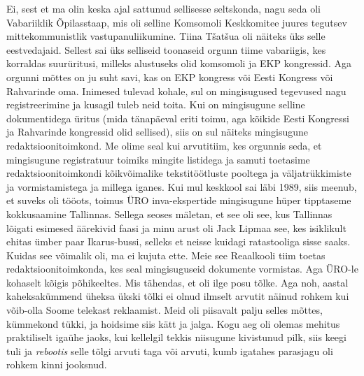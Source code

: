 Ei, sest et ma olin keska ajal sattunud sellisesse seltskonda, nagu seda oli Vabariiklik Õpilasstaap, mis oli selline Komsomoli Keskkomitee juures tegutsev mittekommunistlik vastupanuliikumine. Tiina Tšatšua oli näiteks üks selle eestvedajaid. Sellest sai üks selliseid toonaseid orgunn tiime vabariigis, kes korraldas suurüritusi, milleks alustuseks olid komsomoli ja EKP kongressid. Aga orgunni mõttes on ju suht savi, kas on EKP kongress või Eesti Kongress või Rahvarinde oma. Inimesed tulevad kohale, sul on mingisugused tegevused nagu  registreerimine ja kusagil tuleb neid toita. Kui on mingisugune selline dokumentidega üritus (mida tänapäeval eriti toimu, aga kõikide Eesti Kongressi ja Rahvarinde kongressid olid sellised), siis on sul näiteks mingisugune redaktsioonitoimkond. Me olime seal kui arvutitiim, kes orgunnis seda, et mingisugune registratuur toimiks mingite listidega ja samuti toetasime redaktsioonitoimkondi  kõikvõimalike tekstitöötluste pooltega ja  väljatrükkimiste ja vormistamistega ja millega iganes. Kui mul  keskkool sai läbi 1989, siis meenub, et suveks oli tööots, toimus ÜRO inva-ekspertide mingisugune hüper tipptaseme kokkusaamine Tallinnas. Sellega seoses mäletan, et see oli see, kus Tallinnas lõigati esimesed äärekivid faasi ja minu arust oli Jack Lipmaa see, kes isiklikult ehitas ümber paar Ikarus-bussi, selleks et neisse  kuidagi  ratastooliga sisse saaks. Kuidas see võimalik oli, ma ei kujuta ette. Meie see Reaalkooli tiim toetas  redaktsioonitoimkonda,  kes seal mingisuguseid dokumente vormistas. Aga ÜRO-le kohaselt kõigis põhikeeltes. Mis tähendas, et oli ilge posu tõlke. Aga noh, aastal kaheksakümmend üheksa ükski tõlki ei olnud ilmselt arvutit näinud rohkem kui võib-olla Soome telekast reklaamist. Meid oli piisavalt palju selles mõttes, kümmekond tükki,  ja hoidsime siis kätt ja jalga. Kogu aeg oli olemas mehitus  praktiliselt igaühe jaoks, kui kellelgil tekkis niisugune kivistunud pilk, siis keegi tuli ja \emph{rebootis} selle tõlgi arvuti taga või arvuti, kumb igatahes parasjagu oli rohkem kinni jooksnud. 

